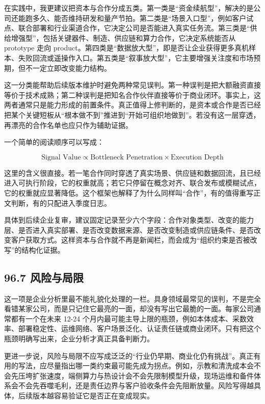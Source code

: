 在实践中，我更建议把资本与合作分成五类。第一类是“资金续航型”，解决的是公司还能跑多久、能否维持研发和量产节拍。第二类是“场景入口型”，例如客户试点、联合部署和行业渠道合作，它决定公司是否能进入真实任务流。第三类是“供给增强型”，包括关键器件、制造、供应链和算力合作，它决定系统能否从 prototype 走向 product。第四类是“数据放大型”，即是否让企业获得更多真机样本、失败回流或遥操作入口。第五类是“叙事放大型”，它主要增强关注度和市场预期，但不一定立即改变能力结构。

这一分类能帮助后续版本维护时避免两种常见误判。第一种误判是把大额融资直接等价于技术成熟；第二种误判是把知名合作伙伴直接等价于商业闭环。事实上，这两者通常只是能力形成的前置条件。真正值得上修判断的，是资本或合作是否已经把某个关键短板从“根本做不到”推进到“开始可组织地做到”。若没有这一层穿透，再漂亮的合作名单也应只作为辅助证据。

一个简单的阅读顺序可以写成：

\begingroup
\footnotesize
\begin{equation*}
\text{Signal Value} \propto \text{Bottleneck Penetration} \times \text{Execution Depth}
\end{equation*}
\endgroup

这里的含义很直接。若一笔合作同时穿透了真实场景、供应链和数据回流，且已经进入可执行阶段，它的权重就高；若它只停留在概念对齐、联合发布或模糊试点，它的权重就应显著降低。这个框架也解释了为什么同样叫“合作”，有的值得重写正文判断，有的只配进入季度日志。

具体到后续企业复审，建议固定记录至少六个字段：合作对象类型、改变的能力层、是否进入真实部署、是否改变数据来源、是否改变制造或供应链条件、是否改变客户获取方式。这样资本与合作就不再是新闻栏，而会成为“组织约束是否被改写”的结构化证据。

\subsection*{96.7 风险与局限}


这一项是企业分析里最不能礼貌化处理的一栏。具身领域最常见的误判，不是完全看错某家公司，而是只记住它最亮的一面，却没有写出它最脆的一面。每家公司通常都有一个在未来 12-24 个月内最可能主导上限的瓶颈，例如本体成本、采数效率、部署稳定性、运维网络、客户场景泛化、认证责任链或商业闭环。只有把这个瓶颈明确写出来，企业分析才真正具备判断力。

更进一步说，风险与局限不应写成泛泛的“行业仍早期、商业化仍有挑战”。真正有用的写法，应尽量指出哪一类约束最可能先成为拐点。例如，示教和清洗成本会不会先压垮扩张速度，端侧算力与热设计会不会先限制模型升级，现场运维和备件体系会不会先吞噬毛利，还是责任边界与客户验收条件会先阻断放量。风险写得越具体，后续版本越容易验证它是否正在变成现实。

